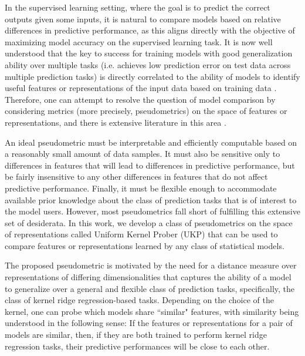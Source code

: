 \documentclass{article}
\theoremstyle{plain}
\begin{document}
In the supervised learning setting, where the goal is to predict the correct outputs given some inputs, it is natural to compare models based on relative differences in predictive performance, as this aligns directly with the objective of maximizing model accuracy on the supervised learning task. It is now well understood that the key to success for training models with good generalization ability over multiple tasks (i.e. achieves low prediction error on test data across multiple prediction tasks) is directly correlated to the ability of models to identify useful features or representations of the input data based on training data \cite{bengio2013representation,lecun2015deep,maurer2016benefit}. Therefore, one can attempt to resolve the question of model comparison by considering metrics (more precisely, pseudometrics) on the space of features or representations, and there is extensive literature in this area \cite{laakso2000content,li2015convergent,morcos2018insights,wang2018towards,kornblith2019similarity,GULP}.

  An ideal pseudometric must be interpretable and efficiently computable based on a reasonably small amount of data samples. It must also be sensitive only to differences in features that will lead to differences in predictive performance, but be fairly insensitive to any other differences in features that do not affect predictive performance. Finally, it must be flexible enough to accommodate available prior knowledge about the class of prediction tasks that is of interest to the model users. However, most pseudometrics fall short of fulfilling this extensive set of desiderata. In this work, we develop a class of pseudometrics on the space of representations called Uniform Kernel Prober (UKP) that can be used to compare features or representations learned by any class of statistical models. 

 The proposed pseudometric is motivated by the need for a distance measure over representations of differing 
 dimensionalities that captures the ability of a model to generalize over a general and flexible class of prediction tasks, specifically, the class of kernel ridge regression-based tasks. Depending on the choice of the kernel, one can probe which models share ``similar" features, with similarity being understood in the following sense: If the features or representations for a pair of models are similar, then, if they are both trained to perform kernel ridge regression tasks, their predictive performances will be close to each other.
 
\end{document}
